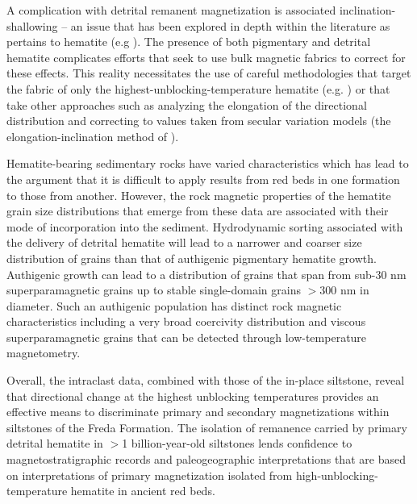 \documentclass[draft]{agujournal2019}
\begin{document}
A complication with detrital remanent magnetization is associated inclination-shallowing -- an issue that has been explored in depth within the literature as pertains to hematite (e.g \cite{Tauxe1984a, Iosifidi2010a, Bilardello2010a}). The presence of both pigmentary and detrital hematite complicates efforts that seek to use bulk magnetic fabrics to correct for these effects. This reality necessitates the use of careful methodologies that target the fabric of only the highest-unblocking-temperature hematite (e.g. \cite{Bilardello2015a}) or that take other approaches such as analyzing the elongation of the directional distribution and correcting to values taken from secular variation models (the elongation-inclination method of \cite{Tauxe2004a}).

Hematite-bearing sedimentary rocks have varied characteristics which has lead to the argument that it is difficult to apply results from red beds in one formation to those from another. However, the rock magnetic properties of the hematite grain size distributions that emerge from these data are associated with their mode of incorporation into the sediment. Hydrodynamic sorting associated with the delivery of detrital hematite will lead to a narrower and coarser size distribution of grains than that of authigenic pigmentary hematite growth. Authigenic growth can lead to a distribution of grains that span from sub-30 nm superparamagnetic grains up to stable single-domain grains $>$300 nm in diameter. Such an authigenic population has distinct rock magnetic characteristics including a very broad coercivity distribution and viscous superparamagnetic grains that can be detected through low-temperature magnetometry. 
 
Overall, the intraclast data, combined with those of the in-place siltstone, reveal that directional change at the highest unblocking temperatures provides an effective means to discriminate primary and secondary magnetizations within siltstones of the Freda Formation. The isolation of remanence carried by primary detrital hematite in $>$1 billion-year-old siltstones lends confidence to magnetostratigraphic records and paleogeographic interpretations that are based on interpretations of primary magnetization isolated from high-unblocking-temperature hematite in ancient red beds. 



\end{document}
